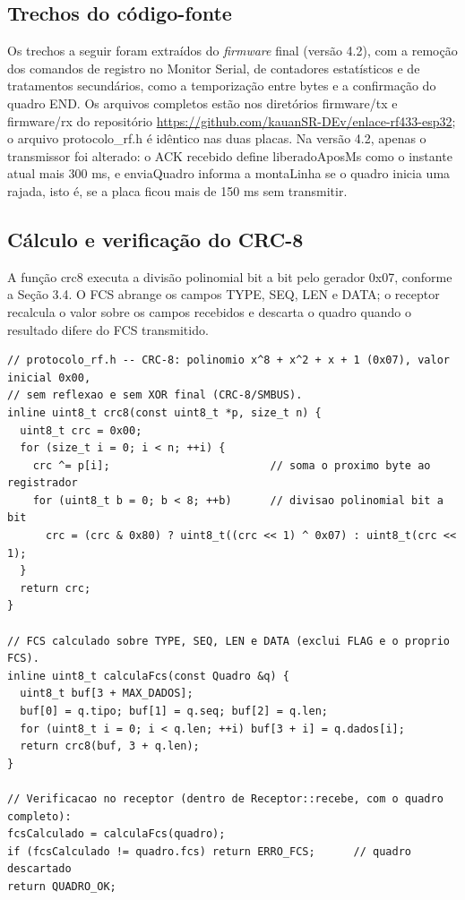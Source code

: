 \documentclass[12pt, oneside, a4paper, sumario=tradicional, chapter=TITLE, brazilian]{abntex2}
\begin{document}
\begin{apendicesenv}
\chapter{Trechos do código-fonte}
Os trechos a seguir foram extraídos do \textit{firmware} final (versão 4.2), com a remoção dos comandos de registro no Monitor Serial, de contadores estatísticos e de tratamentos secundários, como a temporização entre bytes e a confirmação do quadro END. Os arquivos completos estão nos diretórios firmware/tx e firmware/rx do repositório \url{https://github.com/kauanSR-DEv/enlace-rf433-esp32}; o arquivo protocolo\_rf.h é idêntico nas duas placas. Na versão 4.2, apenas o transmissor foi alterado: o ACK recebido define liberadoAposMs como o instante atual mais 300 ms, e enviaQuadro informa a montaLinha se o quadro inicia uma rajada, isto é, se a placa ficou mais de 150 ms sem transmitir.

\section{Cálculo e verificação do CRC-8}

A função crc8 executa a divisão polinomial bit a bit pelo gerador 0x07, conforme a Seção 3.4. O FCS abrange os campos TYPE, SEQ, LEN e DATA; o receptor recalcula o valor sobre os campos recebidos e descarta o quadro quando o resultado difere do FCS transmitido.

\begin{Verbatim}[fontsize=\scriptsize,frame=single,framesep=2mm,rulecolor=\color{gray!60},breaklines,breakanywhere]
// protocolo_rf.h -- CRC-8: polinomio x^8 + x^2 + x + 1 (0x07), valor inicial 0x00,
// sem reflexao e sem XOR final (CRC-8/SMBUS).
inline uint8_t crc8(const uint8_t *p, size_t n) {
  uint8_t crc = 0x00;
  for (size_t i = 0; i < n; ++i) {
    crc ^= p[i];                         // soma o proximo byte ao registrador
    for (uint8_t b = 0; b < 8; ++b)      // divisao polinomial bit a bit
      crc = (crc & 0x80) ? uint8_t((crc << 1) ^ 0x07) : uint8_t(crc << 1);
  }
  return crc;
}

// FCS calculado sobre TYPE, SEQ, LEN e DATA (exclui FLAG e o proprio FCS).
inline uint8_t calculaFcs(const Quadro &q) {
  uint8_t buf[3 + MAX_DADOS];
  buf[0] = q.tipo; buf[1] = q.seq; buf[2] = q.len;
  for (uint8_t i = 0; i < q.len; ++i) buf[3 + i] = q.dados[i];
  return crc8(buf, 3 + q.len);
}

// Verificacao no receptor (dentro de Receptor::recebe, com o quadro completo):
fcsCalculado = calculaFcs(quadro);
if (fcsCalculado != quadro.fcs) return ERRO_FCS;      // quadro descartado
return QUADRO_OK;
\end{Verbatim}


\end{apendicesenv}
\end{document}
